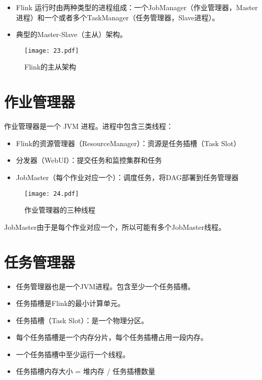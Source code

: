 \documentclass[cn,11pt,chinese]{elegantbook}
\begin{document}
\begin{itemize}
  \item Flink 运行时由两种类型的进程组成：一个JobManager（作业管理器，Master进程）和一个或者多个TaskManager（任务管理器，Slave进程）。
  \item 典型的Master-Slave（主从）架构。
\end{itemize}

\begin{figure}[htbp]
  \centering
  \texttt{[image: 23.pdf]}
  \caption{Flink的主从架构}
\end{figure}

\section{作业管理器}

作业管理器是一个 JVM 进程。进程中包含三类线程：

\begin{itemize}
  \item Flink的资源管理器（ResourceManager）：资源是任务插槽（Task Slot）
  \item 分发器（WebUI）：提交任务和监控集群和任务
  \item JobMaster（每个作业对应一个）：调度任务，将DAG部署到任务管理器
\end{itemize}

\clearpage
\begin{figure}[htbp]
  \centering
  \texttt{[image: 24.pdf]}
  \caption{作业管理器的三种线程}
\end{figure}

JobMaster由于是每个作业对应一个，所以可能有多个JobMaster线程。

\section{任务管理器}

\begin{itemize}
  \item 任务管理器也是一个JVM进程。包含至少一个任务插槽。
  \item 任务插槽是Flink的最小计算单元。
  \item 任务插槽（Task Slot）：是一个物理分区。
  \item 每个任务插槽是一个内存分片，每个任务插槽占用一段内存。
  \item 一个任务插槽中至少运行一个线程。
  \item 任务插槽内存大小 = 堆内存 / 任务插槽数量
\end{itemize}
\end{document}
